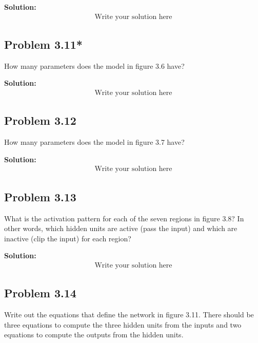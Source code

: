 \documentclass{article}
\begin{document}
        \vspace{1cm}
        \textbf{Solution:}
        \begin{align*}
            \text{Write your solution here}
        \end{align*}

    \subsection*{Problem 3.11*}
    How many parameters does the model in figure 3.6 have?

        \vspace{1cm}
        \textbf{Solution:}
        \begin{align*}
            \text{Write your solution here}
        \end{align*}

    \subsection*{Problem 3.12}
    How many parameters does the model in figure 3.7 have?

        \vspace{1cm}
        \textbf{Solution:}
        \begin{align*}
            \text{Write your solution here}
        \end{align*}

    \subsection*{Problem 3.13}
    What is the activation pattern for each of the seven regions in figure 3.8? In other words, which hidden units are active (pass the input) and which are inactive (clip the input) for each region?

        \vspace{1cm}
        \textbf{Solution:}
        \begin{align*}
            \text{Write your solution here}
        \end{align*}

    \subsection*{Problem 3.14}
    Write out the equations that define the network in figure 3.11. There should be three equations to compute the three hidden units from the inputs and two equations to compute the outputs from the hidden units.
\end{document}
